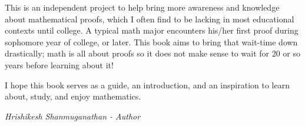 This is an independent project to help bring more awareness and knowledge about mathematical proofs, which I often find to be lacking in most educational contexts until college. A typical math major encounters his/her first proof during sophomore year of college, or later. This book aims to bring that wait-time down drastically; math is all about proofs so it does not make sense to wait for 20 or so years before learning about it!

I hope this book serves as a guide, an introduction, and an inspiration to learn about, study, and enjoy mathematics. 

\bigskip
\noindent
\textit{Hrishikesh Shanmuganathan - Author}